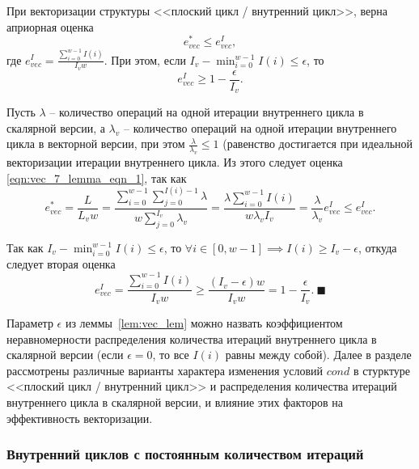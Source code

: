 \begin{lemma}\label{lem:vec_lem}
При векторизации структуры <<плоский цикл / внутренний цикл>>, верна априорная оценка
\begin{equation}\label{eqn:vec_7_lemma_eqn_1}
e_{vec}^{*} \le e_{vec}^I,
\end{equation}
где $e_{vec}^I = \frac{ \sum_{i = 0}^{w - 1}{I(i)} }{I_v w}$.
При этом, если $I_v - \min_{i = 0}^{w - 1}{I(i)} \le \epsilon$, то
\begin{equation}\label{eqn:vec_7_lemma_eqn_2}
e_{vec}^I \ge 1 - \frac{\epsilon}{I_v}.
\end{equation}
\end{lemma}

Пусть $\lambda$ -- количество операций на одной итерации внутреннего цикла в скалярной версии, а $\lambda_v$ -- количество операций на одной итерации внутреннего цикла в векторной версии, при этом $\frac{\lambda}{\lambda_v} \le 1$ (равенство достигается при идеальной векторизации итерации внутреннего цикла.
Из этого следует оценка \eqref{eqn:vec_7_lemma_eqn_1}, так как
\begin{equation}
	e_{vec}^{*} = \frac{L}{L_v w} = \frac{\sum_{i = 0}^{w - 1}{\sum_{j = 0}^{I(i) - 1}{\lambda}}}{w \sum_{j = 0}^{I_v}{\lambda_v}} = \frac{\lambda \sum_{i = 0}^{w - 1}{I(i)}}{w \lambda_v I_v} = \frac{\lambda}{\lambda_v} e_{vec}^I \le e_{vec}^I.
\end{equation}

Так как $I_v - \min_{i = 0}^{w - 1}{I(i)} \le \epsilon$, то $\forall i \in [0, w - 1] \implies I(i) \ge I_v - \epsilon$, откуда следует вторая оценка
\begin{equation}
	e_{vec}^I = \frac{\sum_{i = 0}^{w - 1}{I(i)}}{I_v w} \ge \frac{(I_v - \epsilon) w}{I_v w} = 1 - \frac{\epsilon}{I_v}. \ \blacksquare
\end{equation}

Параметр $\epsilon$ из леммы~\ref{lem:vec_lem} можно назвать коэффициентом неравномерности распределения количества итераций внутреннего цикла в скалярной версии (если $\epsilon = 0$, то все $I(i)$ равны между собой).
Далее в разделе рассмотрены различные варианты характера изменения условий $cond$ в стурктуре <<плоский цикл / внутренний цикл>> и распределения количества итераций внутреннего цикла в скалярной версии, и влияние этих факторов на эффективность векторизации.

\subsubsection{Внутренний циклов с постоянным количеством итераций}\label{sec:text_4_vec_mesh_intersect}

